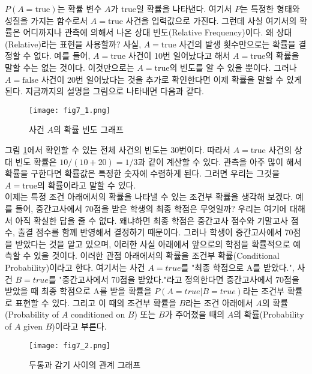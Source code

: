 \documentclass[a4paper]{oblivoir}
\begin{document}
\indent $P(A=\textrm{true})$는 확률 변수 $A$가 true일 확률을 나타낸다. 여기서 $P$는 특정한 형태와 성질을 가지는 함수로서 $A=\textrm{true}$ 사건을 입력값으로 가진다. 그런데 사실 여기서의 확률은 어디까지나 관측에 의해서 나온 상대 빈도(Relative Frequency)이다. 왜 상대(Relative)라는 표현을 사용할까? 사실, $A=\textrm{true}$ 사건의 발생 횟수만으로는 확률을 결정할 수 없다. 예를 들어, $A=\textrm{true}$ 사건이 10번 일어났다고 해서 $A=\textrm{true}$의 확률을 말할 수는 없는 것이다. 이것만으로는 $A=\textrm{true}$의 빈도를 알 수 있을 뿐이다. 그러나 $A=\textrm{false}$ 사건이 20번 일어났다는 것을 추가로 확인한다면 이제 확률을 말할 수 있게 된다. 지금까지의 설명을 그림으로 나타내면 다음과 같다. \\ 

\begin{figure}[ht] \centering 
\texttt{[image: fig7\_1.png]} 
\caption{사건 $A$의 확률 빈도 그래프}
\label{fig:7-1}
\end{figure} 

\noindent 그림 \ref{fig:7-1}에서 확인할 수 있는 전체 사건의 빈도는 30번이다. 따라서 $A=\textrm{true}$ 사건의 상대 빈도 확률은 $10/(10+20) = 1/3$과 같이 계산할 수 있다. 관측을 아주 많이 해서 확률을 구한다면 확률값은 특정한 숫자에 수렴하게 된다. 그러면 우리는 그것을 $A=\textrm{true}$의 확률이라고 말할 수 있다. \\

\indent 이제는 특정 조건 아래에서의 확률을 나타낼 수 있는 조건부 확률을 생각해 보겠다. 예를 들어, 중간고사에서 70점을 받은 학생의 최종 학점은 무엇일까? 우리는 여기에 대해서 아직 확실한 답을 줄 수 없다. 왜냐하면 최종 학점은 중간고사 점수와 기말고사 점수, 출결 점수를 함께 반영해서 결정하기 때문이다. 그러나 학생이 중간고사에서 70점을 받았다는 것을 알고 있으며, 이러한 사실 아래에서 앞으로의 학점을 확률적으로 예측할 수 있을 것이다. 이러한 관점 아래에서의 확률을 조건부 확률(Conditional Probability)이라고 한다. 여기서는 사건 $A=true$를 "최종 학점으로 A를 받았다.", 사건 $B=true$를 "중간고사에서 70점을 받았다."라고 정의한다면 중간고사에서 70점을 받았을 때 최종 학점으로 A를 받을 확률을 $P(A=true|B=true)$라는 조건부 확률로 표현할 수 있다. 그리고 이 때의 조건부 확률을 $B$라는 조건 아래에서 $A$의 확률(Probability of $A$ conditioned on $B$) 또는 $B$가 주어졌을 때의 $A$의 확률(Probability of $A$ given $B$)이라고 부른다. \\

\begin{figure}[ht] \centering 
\texttt{[image: fig7\_2.png]} 
\caption{두통과 감기 사이의 관계 그래프}
\label{fig:7-2}
\end{figure} 
\end{document}
